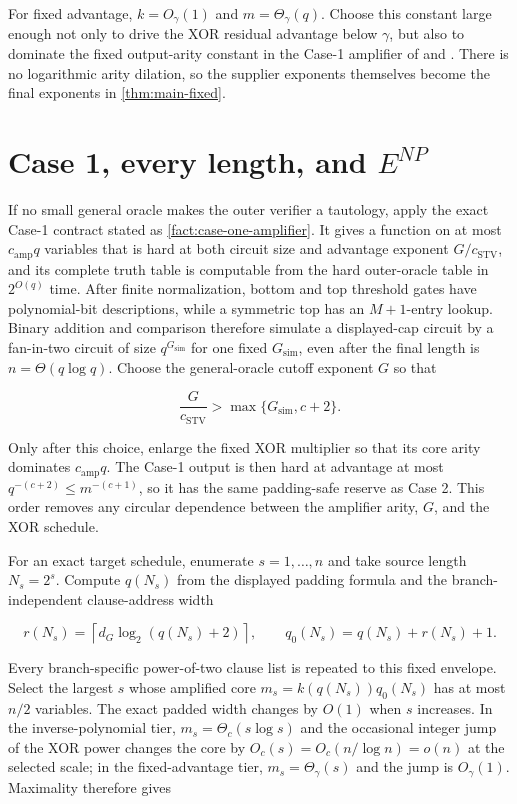 \documentclass[11pt,letterpaper]{article}
\newcommand{\cref}[1]{\ref{#1}}
\theoremstyle{definition}
\theoremstyle{remark}
\begin{document}
For fixed advantage, \(k=O_\gamma(1)\) and \(m=\Theta_\gamma(q)\).
Choose this constant large enough not only to drive the XOR residual
advantage below \(\gamma\), but also to dominate the fixed output-arity
constant in the Case-1 amplifier of \cite[Lemma 3.9]{CLW20} and
\cite[Theorem 24]{STV01}. There is no logarithmic arity dilation, so the supplier exponents
themselves become the final exponents in \cref{thm:main-fixed}.

\section{\texorpdfstring{Case 1, every length, and
\(E^{NP}\)}{Case 1, every length, and E\^{}\{NP\}}}\label{7-case-1-every-length-and-enp}

If no small general oracle makes the outer verifier a tautology, apply
the exact Case-1 contract stated as \cref{fact:case-one-amplifier}. It gives a function on
at most \(c_{\mathrm{amp}}q\) variables that is hard at both circuit
size and advantage exponent \(G/c_{\mathrm{STV}}\), and its complete
truth table is computable from the hard outer-oracle table in
\(2^{O(q)}\) time. After finite normalization, bottom and top threshold
gates have polynomial-bit descriptions, while a symmetric top has an
\(M+1\)-entry lookup. Binary addition and comparison therefore simulate
a displayed-cap circuit by a fan-in-two circuit of size
\(q^{G_{\mathrm{sim}}}\) for one fixed \(G_{\mathrm{sim}}\), even after
the final length is \(n=\Theta(q\log q)\). Choose the general-oracle
cutoff exponent \(G\) so that

\[
\frac{G}{c_{\mathrm{STV}}}
{}>{}
\max\{G_{\mathrm{sim}},c+2\}.
\]

Only after this choice, enlarge the fixed XOR multiplier so that its
core arity dominates \(c_{\mathrm{amp}}q\). The Case-1 output is then
hard at advantage at most \(q^{-(c+2)}\le m^{-(c+1)}\), so it has the
same padding-safe reserve as Case 2. This order removes any circular
dependence between the amplifier arity, \(G\), and the XOR schedule.

For an exact target schedule, enumerate \(s=1,\ldots,n\) and take source
length \(N_s=2^s\). Compute \(q(N_s)\) from the displayed padding
formula and the branch-independent clause-address width

\[
r(N_s)=\left\lceil d_G\log_2(q(N_s)+2)\right\rceil,
\qquad
q_0(N_s)=q(N_s)+r(N_s)+1.
\]

Every branch-specific power-of-two clause list is repeated to this fixed
envelope. Select the largest \(s\) whose amplified core
\(m_s=k(q(N_s))q_0(N_s)\) has at most \(n/2\) variables. The exact
padded width changes by \(O(1)\) when \(s\) increases. In the
inverse-polynomial tier, \(m_s=\Theta_c(s\log s)\) and the occasional
integer jump of the XOR power changes the core by
\(O_c(s)=O_c(n/\log n)=o(n)\) at the selected scale; in the
fixed-advantage tier, \(m_s=\Theta_\gamma(s)\) and the jump is
\(O_\gamma(1)\). Maximality therefore gives
\end{document}

